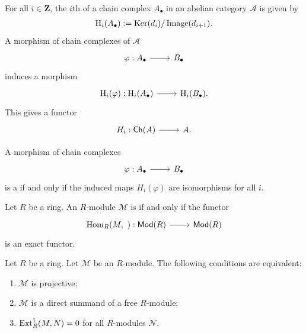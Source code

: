 \documentclass [11 pt, oneside] {article}
\begin{document}
\begin{definition}[ ]\label{}\text{}
For all $i\in \mathbf{Z}$, the $i$th  of a chain complex $A_\bullet$ in an abelian category $\mathscr{A}$ is given by
\begin{align*}
	\operatorname{H}_i(A_\bullet) := \operatorname{Ker}  (d_i)/\operatorname{Image} (d_{i+1}).
\end{align*}
A morphism of chain complexes of $\mathscr{A}$ 
\[
\begin{tikzcd}
\varphi: A_\bullet\ar[r]& B_\bullet
\end{tikzcd}
\] 
induces a morphism 
\[
\begin{tikzcd}
\HH_i(\varphi): \HH_i (A_\bullet) \ar[r]&\HH_i(B_\bullet). 
\end{tikzcd}
\] 
This gives a functor
\[
\begin{tikzcd}
H_i : \catn{Ch}(\mathscr{A}) \ar[r]& \mathscr{A}.
\end{tikzcd}
\] 
\end{definition}

\begin{definition}\label{}\text{}
A morphism of chain complexes 
\[
\begin{tikzcd}
\varphi : A_\bullet \ar[r]& B_\bullet
\end{tikzcd}
\] 
is a  if and only if the induced maps $H_i(\varphi)$ are isomorphisms for all $i$.
\end{definition}


\begin{definition}\label{}\text{}
Let $R$ be a ring. An $R$-module $\mathscr{M}$ is  if and only if the functor 
\[
\begin{tikzcd}
\Hom_{R}(\mathscr{M}, \ ): \catn{Mod}(R)  \ar[r]& \catn{Mod}(R)
\end{tikzcd}
\] 
is an exact functor.
\end{definition}

\begin{remark}
	Let $R$ be a ring. Let $\mathscr{M}$ be an $R$-module. The following conditions are equivalent:
	\begin{enumerate}
		\item $\mathscr{M}$ is projective;
		\item $\mathscr{M}$ is a direct summand of a free $R$-module;
		\item $\operatorname{Ext}_R^1(\relax{M}, \relax{N}) =0$ for all $R$-modules $\mathscr{N}$.
	\end{enumerate}
\end{remark}
\end{document}
